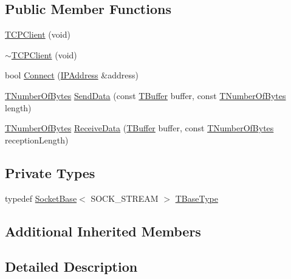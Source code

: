 \subsection*{Public Member Functions}
\begin{DoxyCompactItemize}
\item 
\hyperlink{class_t_c_p_client_a091bd16baee06d0c980062a442b2c1c4}{T\-C\-P\-Client} (void)
\item 
\hyperlink{class_t_c_p_client_a2a31d81f04bfb18988d68cdd0da007e3}{$\sim$\-T\-C\-P\-Client} (void)
\item 
bool \hyperlink{class_t_c_p_client_af093afaf101502080174a55518070c8b}{Connect} (\hyperlink{class_i_p_address}{I\-P\-Address} \&address)
\item 
\hyperlink{class_socket_base_ac414903631491453b96e71c06c2c2e72}{T\-Number\-Of\-Bytes} \hyperlink{class_t_c_p_client_a6ed7eb539935dc08de06ca331e384241}{Send\-Data} (const \hyperlink{class_socket_base_a1557d64029a25c20b4c306b80efcc143}{T\-Buffer} buffer, const \hyperlink{class_socket_base_ac414903631491453b96e71c06c2c2e72}{T\-Number\-Of\-Bytes} length)
\item 
\hyperlink{class_socket_base_ac414903631491453b96e71c06c2c2e72}{T\-Number\-Of\-Bytes} \hyperlink{class_t_c_p_client_a01ad319e429ac5f10120a503d0ce40a1}{Receive\-Data} (\hyperlink{class_socket_base_a1557d64029a25c20b4c306b80efcc143}{T\-Buffer} buffer, const \hyperlink{class_socket_base_ac414903631491453b96e71c06c2c2e72}{T\-Number\-Of\-Bytes} reception\-Length)
\end{DoxyCompactItemize}
\subsection*{Private Types}
\begin{DoxyCompactItemize}
\item 
typedef \hyperlink{class_socket_base}{Socket\-Base}$<$ S\-O\-C\-K\-\_\-\-S\-T\-R\-E\-A\-M $>$ \hyperlink{class_t_c_p_client_a562f13657068ebb1bf1d33fb1d562cbf}{T\-Base\-Type}
\end{DoxyCompactItemize}
\subsection*{Additional Inherited Members}


\subsection{Detailed Description}


